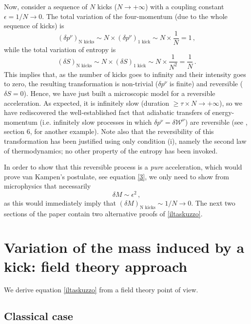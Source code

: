 \documentclass[twocolumn,usenatbib]{mnras2}
\begin{document}
Now, consider a sequence of $N$ kicks ($N \rightarrow +\infty$) with a coupling constant $\epsilon = 1/N \rightarrow 0$. The total variation of the four-momentum (due to the whole sequence of kicks) is
\begin{equation}
(\delta p^\nu)_{\text{N kicks}} \sim N \times (\delta p^\nu)_{\text{1 kick}} \sim N \times \dfrac{1}{N} =1 \, ,
\end{equation} 
while the total variation of entropy is
\begin{equation}
(\delta S)_{\text{N kicks}} \sim N \times (\delta S)_{\text{1 kick}} \sim N \times \dfrac{1}{N^2} = \dfrac{1}{N} \, .
\end{equation}
This implies that, as the number of kicks goes to infinity and their intensity goes to zero, the resulting transformation is non-trivial ($\delta p^\nu$ is finite) and reversible ($\delta S = 0$). Hence, we have just built a microscopic model for a reversible acceleration. As expected, it is infinitely slow (duration $\geq \tau \times N \rightarrow +\infty$), so we have rediscovered the well-established fact that adiabatic transfers of energy-momentum (i.e. infinitely slow processes in which $\delta p^\nu = \delta \mathcal{W}^\nu$) are reversible (see \citealt{GavassinoIorda2021}, section 6, for another example). Note also that the reversibility of this transformation has been justified using only condition (i), namely the second law of thermodynamics; no other property of the entropy has been invoked. 

In order to show that this reversible process is a \textit{pure} acceleration, which would prove van Kampen's postulate, see equation \eqref{3}, we only need to show from microphysics that necessarily
\begin{equation}\label{iltaskuzzo}
\delta M \sim \epsilon^2 \, ,
\end{equation}
as this would immediately imply that $(\delta M)_{\text{N kicks}} \sim 1/N \rightarrow 0$. The next two sections of the paper contain two alternative proofs of \eqref{iltaskuzzo}.



\section{Variation of the mass induced by a kick: field theory approach}

We derive equation \eqref{iltaskuzzo} from a field theory point of view. 

\subsection{Classical case}\label{classonz}
\end{document}
